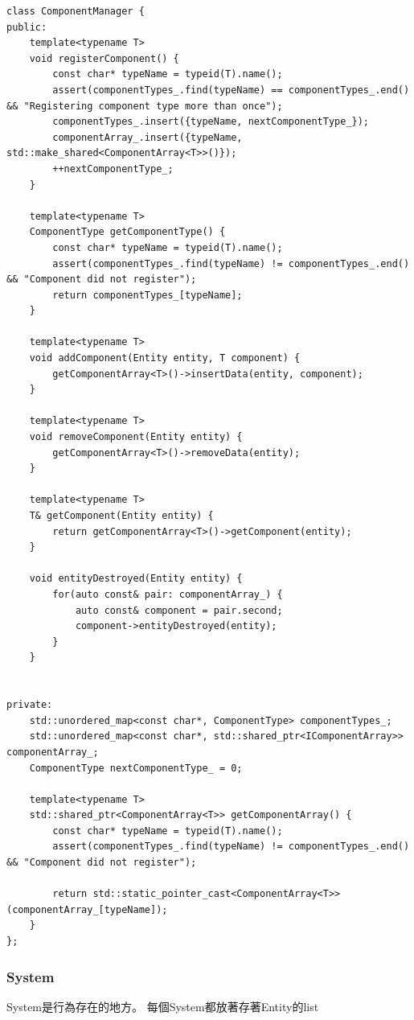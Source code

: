 \begin{lstlisting}
class ComponentManager {
public:
    template<typename T>
    void registerComponent() {
        const char* typeName = typeid(T).name();
        assert(componentTypes_.find(typeName) == componentTypes_.end() && "Registering component type more than once");
        componentTypes_.insert({typeName, nextComponentType_});
        componentArray_.insert({typeName, std::make_shared<ComponentArray<T>>()});
        ++nextComponentType_;
    }

    template<typename T>
    ComponentType getComponentType() {
        const char* typeName = typeid(T).name();
        assert(componentTypes_.find(typeName) != componentTypes_.end() && "Component did not register");
        return componentTypes_[typeName];
    }

    template<typename T>
    void addComponent(Entity entity, T component) {
        getComponentArray<T>()->insertData(entity, component);
    }

    template<typename T>
    void removeComponent(Entity entity) {
        getComponentArray<T>()->removeData(entity);
    }

    template<typename T>
    T& getComponent(Entity entity) {
        return getComponentArray<T>()->getComponent(entity);
    }

    void entityDestroyed(Entity entity) {
        for(auto const& pair: componentArray_) {
            auto const& component = pair.second;
            component->entityDestroyed(entity);
        }
    }


private:
    std::unordered_map<const char*, ComponentType> componentTypes_;
    std::unordered_map<const char*, std::shared_ptr<IComponentArray>> componentArray_;
    ComponentType nextComponentType_ = 0;

    template<typename T>
    std::shared_ptr<ComponentArray<T>> getComponentArray() {
        const char* typeName = typeid(T).name();
        assert(componentTypes_.find(typeName) != componentTypes_.end() && "Component did not register");

        return std::static_pointer_cast<ComponentArray<T>>(componentArray_[typeName]);
    }
};
\end{lstlisting}

\subsubsection{System}

System是行為存在的地方。
每個System都放著存著Entity的list

